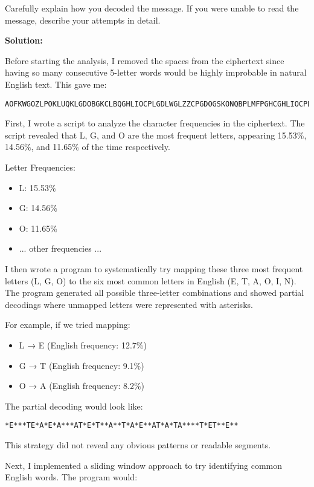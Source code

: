\documentclass[12pt]{article}
\begin{document}
Carefully explain how you decoded the message. If you were unable to read the message, describe your attempts in detail.

\vspace{1em}
\textbf{Solution:}

Before starting the analysis, I removed the spaces from the ciphertext since having so many consecutive 5-letter words would be highly improbable in natural English text. This gave me:

\begin{verbatim}
AOFKWGOZLPOKLUQKLGDOBGKCLBQGHLIOCPLGDLWGLZZCPGDOGSKONQBPLMFPGHCGHLIOCPLGDLWGLZZCPGDOGSKONQBPIOBHLHLOGLB
\end{verbatim}


First, I wrote a script to analyze the character frequencies in the ciphertext. The script revealed that L, G, and O are the most frequent letters, appearing 15.53\%, 14.56\%, and 11.65\% of the time respectively.

Letter Frequencies:
\begin{itemize}
    \item L: 15.53\%
    \item G: 14.56\%
    \item O: 11.65\%
    \item ... other frequencies ...
\end{itemize}

I then wrote a program to systematically try mapping these three most frequent letters (L, G, O) to the six most common letters in English (E, T, A, O, I, N). The program generated all possible three-letter combinations and showed partial decodings where unmapped letters were represented with asterisks.

For example, if we tried mapping:
\begin{itemize}
    \item L → E (English frequency: 12.7\%)
    \item G → T (English frequency: 9.1\%)
    \item O → A (English frequency: 8.2\%)
\end{itemize}

The partial decoding would look like:
\begin{verbatim}
*E***TE*A*E*A***AT*E*T**A**T*A*E**AT*A*TA****T*ET**E**
\end{verbatim}

This strategy did not reveal any obvious patterns or readable segments. 

\vspace{1em}
Next, I implemented a sliding window approach to try identifying common English words. The program would:
\end{document}
